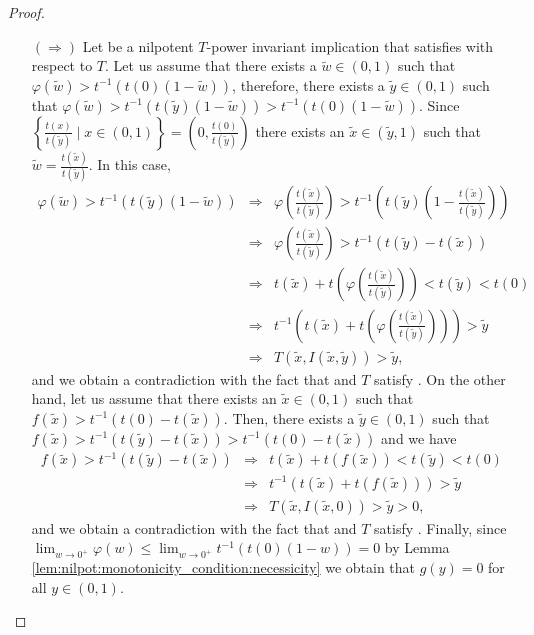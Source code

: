 \begin{proof}
	\begin{itemize}
		\item[$(\Rightarrow)$] Let \IT be a nilpotent $T$-power invariant implication that satisfies \TC with respect to $T$. Let us assume that there exists a $\tilde{w} \in (0,1)$ such that $\varphi(\tilde{w})>t^{-1}(t(0)(1-\tilde{w}))$, therefore, there exists a $\tilde{y} \in (0,1)$ such that $\varphi(\tilde{w})>t^{-1}(t(\tilde{y})(1-\tilde{w}))>t^{-1}(t(0)(1-\tilde{w}))$. Since $\left\{\frac{t(x)}{t(\tilde{y})} \mid x \in (0,1)\right\} = \left(0,\frac{t(0)}{t(\tilde{y})}\right)$ there exists an $\tilde{x} \in (\tilde{y},1)$ such that $\tilde{w}=\frac{t(\tilde{x})}{t(\tilde{y})}$. In this case,
		\begin{eqnarray*}
			\varphi(\tilde{w})>t^{-1}(t(\tilde{y})(1-\tilde{w})) & \Rightarrow &  \varphi\left(\frac{t(\tilde{x})}{t(\tilde{y})}\right)>t^{-1}\left(t\left(\tilde{y}\right)\left(1-\frac{t(\tilde{x})}{t(\tilde{y})}\right)\right)\\
			& \Rightarrow &  \varphi\left(\frac{t(\tilde{x})}{t(\tilde{y})}\right)>t^{-1}\left(t(\tilde{y})-t(\tilde{x})\right) \\
			& \Rightarrow &  t(\tilde{x}) + t\left(\varphi\left(\frac{t(\tilde{x})}{t(\tilde{y})}\right)\right)<t(\tilde{y})<t(0) \\
			& \Rightarrow &  t^{-1}\left(t(\tilde{x}) + t\left(\varphi\left(\frac{t(\tilde{x})}{t(\tilde{y})}\right)\right)\right) > \tilde{y} \\
			& \Rightarrow &  T(\tilde{x},I(\tilde{x},\tilde{y})) > \tilde{y},
		\end{eqnarray*}
		and we obtain a contradiction with the fact that \IT and $T$ satisfy \TC. On the other hand, let us assume that there exists an $\tilde{x} \in (0,1)$ such that $f(\tilde{x}) > t^{-1}(t(0)-t(\tilde{x}))$. Then, there exists a $\tilde{y} \in (0,1)$ such that $f(\tilde{x}) > t^{-1}(t(\tilde{y})-t(\tilde{x})) > t^{-1}(t(0)-t(\tilde{x}))$ and we have
		\begin{eqnarray*}
			f(\tilde{x}) > t^{-1}(t(\tilde{y})-t(\tilde{x}))  & \Rightarrow &  t(\tilde{x})+t(f(\tilde{x})) < t(\tilde{y})<t(0)\\
			& \Rightarrow &  t^{-1}\left(t(\tilde{x})+t(f(\tilde{x}))\right) > \tilde{y}\\
			& \Rightarrow &  T(\tilde{x},I(\tilde{x},0)) > \tilde{y} >0,
		\end{eqnarray*}
		and we obtain a contradiction with the fact that \IT and $T$ satisfy \TC. Finally, since $\displaystyle \lim_{w \to 0^+} \varphi(w) \leq \lim_{w \to 0^+} t^{-1} \left(t(0)(1-w)\right) = 0$ by Lemma \ref{lem:nilpot:monotonicity_condition:necessicity} we obtain that $g(y)=0$ for all $ y \in (0,1)$.

\end{itemize}
\end{proof}
